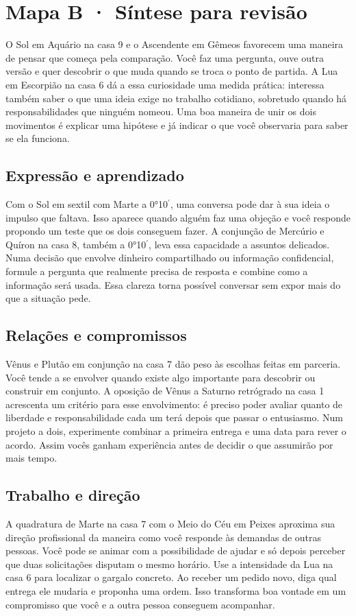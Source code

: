 \section*{Mapa B · Síntese para revisão}

O Sol em Aquário na casa 9 e o Ascendente em Gêmeos favorecem uma maneira de pensar que começa pela comparação. Você faz uma pergunta, ouve outra versão e quer descobrir o que muda quando se troca o ponto de partida. A Lua em Escorpião na casa 6 dá a essa curiosidade uma medida prática: interessa também saber o que uma ideia exige no trabalho cotidiano, sobretudo quando há responsabilidades que ninguém nomeou. Uma boa maneira de unir os dois movimentos é explicar uma hipótese e já indicar o que você observaria para saber se ela funciona.

\subsection*{Expressão e aprendizado}

Com o Sol em sextil com Marte a 0°10\ensuremath{^{\prime}}, uma conversa pode dar à sua ideia o impulso que faltava. Isso aparece quando alguém faz uma objeção e você responde propondo um teste que os dois conseguem fazer. A conjunção de Mercúrio e Quíron na casa 8, também a 0°10\ensuremath{^{\prime}}, leva essa capacidade a assuntos delicados. Numa decisão que envolve dinheiro compartilhado ou informação confidencial, formule a pergunta que realmente precisa de resposta e combine como a informação será usada. Essa clareza torna possível conversar sem expor mais do que a situação pede.

\subsection*{Relações e compromissos}

Vênus e Plutão em conjunção na casa 7 dão peso às escolhas feitas em parceria. Você tende a se envolver quando existe algo importante para descobrir ou construir em conjunto. A oposição de Vênus a Saturno retrógrado na casa 1 acrescenta um critério para esse envolvimento: é preciso poder avaliar quanto de liberdade e responsabilidade cada um terá depois que passar o entusiasmo. Num projeto a dois, experimente combinar a primeira entrega e uma data para rever o acordo. Assim vocês ganham experiência antes de decidir o que assumirão por mais tempo.

\subsection*{Trabalho e direção}

A quadratura de Marte na casa 7 com o Meio do Céu em Peixes aproxima sua direção profissional da maneira como você responde às demandas de outras pessoas. Você pode se animar com a possibilidade de ajudar e só depois perceber que duas solicitações disputam o mesmo horário. Use a intensidade da Lua na casa 6 para localizar o gargalo concreto. Ao receber um pedido novo, diga qual entrega ele mudaria e proponha uma ordem. Isso transforma boa vontade em um compromisso que você e a outra pessoa conseguem acompanhar.